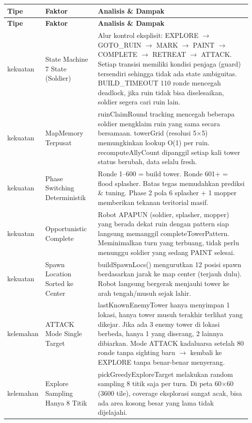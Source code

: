\documentclass{article}
\begin{document}
\begin{enumerate}[label=\alph*.]
\begin{longtable}{|p{2cm}|p{3.5cm}|p{8.5cm}|}
\hline
\textbf{Tipe} & \textbf{Faktor} & \textbf{Analisis \& Dampak} \\
\hline
\endfirsthead
\hline
\textbf{Tipe} & \textbf{Faktor} & \textbf{Analisis \& Dampak} \\
\hline
\endhead
\hline
\endfoot
kekuatan
& State Machine 7 State (Soldier)
& Alur kontrol eksplisit: EXPLORE $\rightarrow$ GOTO\_RUIN $\rightarrow$ MARK $\rightarrow$ PAINT $\rightarrow$ COMPLETE $\rightarrow$ RETREAT $\rightarrow$ ATTACK. Setiap transisi memiliki kondisi penjaga (guard) tersendiri sehingga tidak ada state ambiguitas.
BUILD\_TIMEOUT 110 ronde mencegah deadlock, jika ruin tidak bisa diselesaikan, soldier segera cari ruin lain. \\
\hline
kekuatan
& MapMemory Terpusat
& ruinClaimRound tracking mencegah beberapa soldier mengklaim ruin yang sama secara bersamaan.
towerGrid (resolusi 5$\times$5) memungkinkan lookup O(1) per ruin.
recomputeAllyCount dipanggil setiap kali tower status berubah, data selalu fresh. \\
\hline
kekuatan
& Phase Switching Deterministik
& Ronde 1--600 = build tower. Ronde 601+ = flood splasher. Batas tegas memudahkan prediksi \& tuning.
Phase 2 pola 6 splasher + 1 mopper memberikan tekanan teritorial masif. \\
\hline
kekuatan
& Opportunistic Complete
& Robot APAPUN (soldier, splasher, mopper) yang berada dekat ruin dengan pattern siap langsung memanggil completeTowerPattern.
Meminimalkan turn yang terbuang, tidak perlu menunggu soldier yang sedang PAINT selesai. \\
\hline
kekuatan
& Spawn Location Sorted ke Center
& buildSpawnLocs() mengurutkan 12 posisi spawn berdasarkan jarak ke map center (terjauh dulu).
Robot langsung bergerak menjauhi tower ke arah tengah/musuh sejak lahir. \\
\hline
kelemahan
& ATTACK Mode Single Target
& lastKnownEnemyTower hanya menyimpan 1 lokasi, hanya tower musuh terakhir terlihat yang dikejar.
Jika ada 3 enemy tower di lokasi berbeda, hanya 1 yang diserang, 2 lainnya dibiarkan.
Mode ATTACK kadaluarsa setelah 80 ronde tanpa sighting baru $\rightarrow$ kembali ke EXPLORE tanpa benar-benar menyerang. \\
\hline
kelemahan
& Explore Sampling Hanya 8 Titik
& pickGreedyExploreTarget melakukan random sampling 8 titik saja per turn.
Di peta 60$\times$60 (3600 tile), coverage eksplorasi sangat acak, bisa ada area kosong besar yang lama tidak dijelajahi.

\end{longtable}
\end{enumerate}
\end{document}
